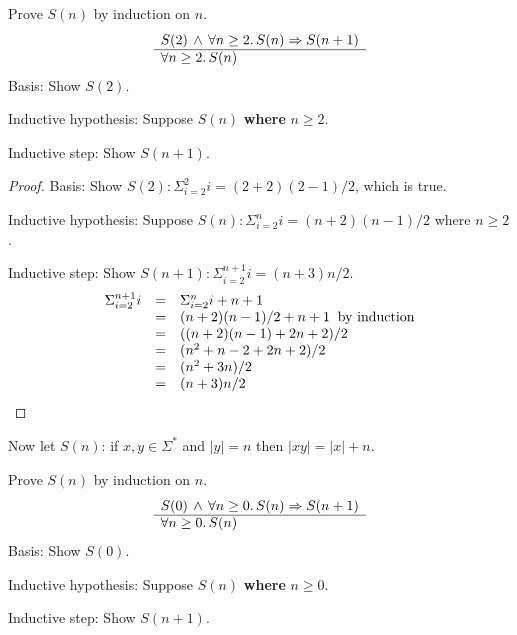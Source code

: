 \documentclass[12pt]{article}
\newcommand{\rid}[1]{\mbox{\rm #1}}
\begin{document}
\noindent Prove $S(n)$ by induction on $n$.
\[
\begin{array}[t]{l}
S(2) \,\wedge\, \forall n\geq 2.\, S(n)\Rightarrow S(n+1) \\
\hline
\forall n\geq 2.\, S(n)
\end{array}
\]
\noindent Basis: Show $S(2)$.

\noindent Inductive hypothesis: Suppose $S(n)$ {\bf where} $n\geq 2$.

\noindent Inductive step: Show $S(n+1)$.

\begin{proof}
\noindent Basis: Show $S(2): \Sigma_{i=2}^2 i = (2+2)(2-1)/2$, which is true.

\vspace{0.5em}
\noindent Inductive hypothesis: Suppose $S(n): \Sigma_{i=2}^{n}i = (n+2)(n-1)/2$ where $n \geq 2$.

\vspace{0.5em}
\noindent Inductive step: Show $S(n+1): \Sigma_{i=2}^{n+1} i = (n+3)n/2$.
\[\begin{array}{lll}
\Sigma_{i=2}^{n+1} i & = & \Sigma_{i=2}^n i + n + 1 \\
 & = & (n+2)(n-1)/2 + n + 1 \;\;\rid{by induction} \\
 & = & ((n+2)(n-1)+2n+2)/2 \\
 & = & (n^2 + n - 2 + 2n + 2)/2 \\
 & = & (n^2 + 3n)/2 \\
 & = & (n+3)n/2
\end{array}
\]
\end{proof}

Now let $S(n)$: if $x,y\in\Sigma^*$ and $|y|=n$ then $|xy| = |x| + n$.

\noindent Prove $S(n)$ by induction on $n$.
\[
\begin{array}[t]{l}
S(0)\,\wedge\,\forall n\geq 0.\, S(n)\Rightarrow S(n+1) \\
\hline
\forall n\geq 0.\, S(n)
\end{array}
\]
\noindent Basis: Show $S(0)$.

\noindent Inductive hypothesis: Suppose $S(n)$ {\bf where} $n\geq 0$.

\noindent Inductive step: Show $S(n+1)$.
\end{document}
